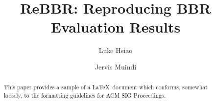 \documentclass[sigconf]{acmart}
\begin{document}
\title{ReBBR: Reproducing BBR Evaluation Results}

\author{Luke Hsiao}

\author{Jervis Muindi}


\begin{abstract}
This paper provides a sample of a \LaTeX\ document which conforms,
somewhat loosely, to the formatting guidelines for
ACM SIG Proceedings.
\end{abstract}




\maketitle









\end{document}
